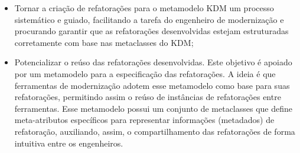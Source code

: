 \begin{itemize}

    \item Tornar a criação de refatorações para o metamodelo KDM um processo sistemático e guiado, facilitando a tarefa do engenheiro de modernização e procurando garantir que as refatorações desenvolvidas estejam estruturadas corretamente com base nas metaclasses do KDM;
    
    \item %
    Potencializar o reúso das refatorações desenvolvidas. Este objetivo é apoiado por um metamodelo para a especificação das refatorações. A ideia é que ferramentas de modernização adotem esse metamodelo como base para suas refatorações, permitindo assim o reúso de instâncias de refatorações entre ferramentas. Esse metamodelo possui um conjunto de metaclasses que define meta-atributos específicos para representar informações (metadados) de refatoração, auxiliando, assim, o compartilhamento das refatorações de forma intuitiva entre os engenheiros. %
    
    
    

	
	
	

\end{itemize}

